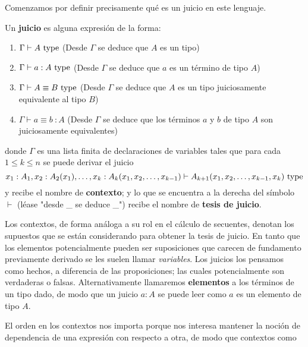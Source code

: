 \documentclass{article}
\begin{document}
        Comenzamos por definir precisamente qué es un juicio en este lenguaje.
        \begin{definition}
            Un \textbf{juicio} es alguna expresión de la forma:
            \begin{enumerate}
                \item $\Gamma \vdash A\ \mathrm{type}$ (Desde $\Gamma$ se deduce que $A$ es un tipo)
                \item $\Gamma \vdash a : A\ \mathrm{type}$ (Desde $\Gamma$ se deduce que $a$ es un término de tipo $A$)
                \item $\Gamma \vdash A \equiv B\ \type$ (Desde $\Gamma$ se deduce que $A$ es un tipo juiciosamente equivalente al tipo $B$)
                \item $\Gamma \vdash a \equiv b\ : A$ (Desde $\Gamma$ se deduce que los términos $a$ y $b$ de tipo $A$ son juiciosamente equivalentes)
            \end{enumerate}

            donde $\Gamma$ es una lista finita de declaraciones de variables tales que para cada $1 \leq k \leq n$
            se puede derivar el juicio
            $$
                x_1 : A_1, x_2 : A_2(x_1), \dots, x_k : A_k(x_1, x_2, \dots, x_{k-1}) \vdash A_{k+1}(x_1, x_2, \dots, x_{k-1}, x_k)\ \mathrm{type}
            $$
            y recibe el nombre de \textbf{contexto}; y lo que se encuentra a la derecha del símbolo $\vdash$ 
            (léase "desde \_ se deduce \_") recibe el nombre de \textbf{tesis de juicio}.
        \end{definition}

        Los contextos, de forma análoga a su rol en el cálculo de secuentes, 
        denotan los supuestos que se están considerando para obtener la tesis 
        de juicio. En tanto que los elementos potencialmente pueden ser 
        suposiciones que carecen de fundamento previamente derivado se les 
        suelen llamar \textit{variables}. Los juicios los pensamos como hechos, 
        a diferencia de las proposiciones; las cuales potencialmente son 
        verdaderas o falsas. Alternativamente llamaremos \textbf{elementos} a 
        los términos de un tipo dado, de modo que un juicio $a : A$ se puede 
        leer como $a$ es un elemento de tipo $A$.

        El orden en los contextos nos importa porque nos interesa mantener la
        noci\'{o}n de dependencia de una expresión con respecto a otra, de modo
        que contextos como
\end{document}
